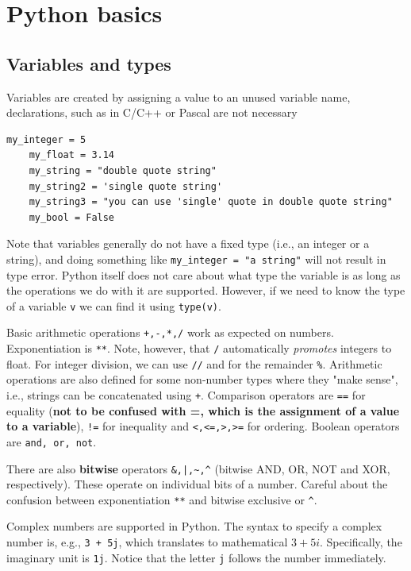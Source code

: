 \documentclass{article}
\newcommand{\ls}[1]{\lstinline{#1}}
\newcounter{syntax}
\begin{document}
\section{Python basics}
\subsection{Variables and types}

Variables are created by assigning a value to an unused variable name, declarations, such as in C/C++ or Pascal are not necessary
\begin{lstlisting}[caption=Defining variables]
    my_integer = 5
    my_float = 3.14
    my_string = "double quote string"
    my_string2 = 'single quote string'
    my_string3 = "you can use 'single' quote in double quote string"
    my_bool = False
\end{lstlisting}

Note that variables generally do not have a fixed type (i.e., an integer or a string), and doing something like \lstinline{my_integer = "a string"} will not result in type error. Python itself does not care about what type the variable is as long as the operations we do with it are supported. However, if we need to know the type of a variable \lstinline{v} we can find it using \lstinline{type(v)}.

Basic arithmetic operations \verb|+,-,*,/| work as expected on numbers. Exponentiation is \verb|**|. Note, however, that \verb|/| automatically \emph{promotes} integers to float. For integer division, we can use \verb|//| and for the remainder \verb|%|. Arithmetic operations are also defined for some non-number types where they "make sense", i.e., strings can be concatenated using \verb|+|. Comparison operators are \verb|==| for equality (\textbf{not to be confused with =, which is the assignment of a value to a variable}), \verb|!=| for inequality and \verb|<,<=,>,>=| for ordering. Boolean operators are \verb|and, or, not|. 

There are also \textbf{bitwise} operators \lstinline{&,|,~,^} (bitwise AND, OR, NOT and XOR, respectively). These operate on individual bits of a number. Careful about the confusion between exponentiation \ls{**} and bitwise exclusive or \ls{^}.

Complex numbers are supported in Python. The syntax to specify a complex number is, e.g., \ls{3 + 5j}, which translates to mathematical $3 + 5i$. Specifically, the imaginary unit is \ls{1j}. Notice that the letter \ls{j} follows the number immediately.
\end{document}
